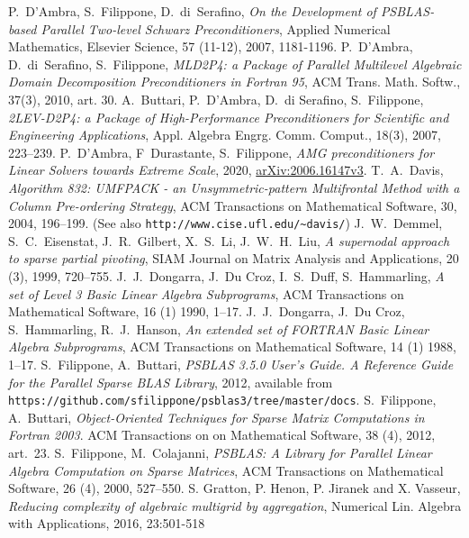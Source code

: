\begin{thebibliography}{99}
%
P.~D'Ambra, S.~Filippone,  D.~di~Serafino,
{\em On the Development of PSBLAS-based Parallel Two-level Schwarz Preconditioners},
Applied Numerical Mathematics, Elsevier Science,
57 (11-12), 2007, 1181-1196.
%
P.~D'Ambra, D.~di~Serafino, S.~Filippone,
\emph{MLD2P4: a Package of Parallel Multilevel
Algebraic Domain Decomposition Preconditioners
in Fortran 95},  ACM Trans. Math. Softw., 37(3), 2010, art. 30.
%
A.~Buttari, P.~D'Ambra, D.~di Serafino, S.~Filippone,
\emph{2{LEV}-{D}2{P}4: a Package of High-Performance Preconditioners
for Scientific and Engineering Applications}, Appl. Algebra Engrg. Comm. Comput.,
18(3), 2007, 223--239.
%
P.~D'Ambra, F~Durastante, S.~Filippone, 
\emph{AMG preconditioners for Linear Solvers towards Extreme Scale}, 2020, \href{https://arxiv.org/abs/2006.16147v3arXiv:2006.16147v2}{arXiv:2006.16147v3}.
%
T.~A.~Davis,
{\em Algorithm 832: UMFPACK - an Unsymmetric-pattern Multifrontal
Method with a Column Pre-ordering Strategy},
ACM Transactions on Mathematical Software, 30, 2004, 196--199.
(See also \texttt{http://www.cise.ufl.edu/{\textasciitilde}davis/})
%
J.~W.~Demmel, S.~C.~Eisenstat, J.~R.~Gilbert, X.~S.~Li, J.~W.~H.~Liu,
{\em A supernodal approach to sparse partial pivoting},
SIAM Journal on Matrix Analysis and Applications, 20 (3), 1999, 720--755.
%
J.~J.~Dongarra, J.~Du Croz, I.~S.~Duff, S.~Hammarling,
\emph{A set of Level 3 Basic Linear Algebra Subprograms},
ACM Transactions on Mathematical Software, 16 (1) 1990, 1--17.
%
J.~J.~Dongarra, J.~Du Croz, S.~Hammarling, R.~J.~Hanson,
\emph{An extended set of FORTRAN Basic Linear Algebra Subprograms},
ACM Transactions on Mathematical Software, 14 (1) 1988, 1--17.
%
%
%
S.~Filippone, A.~Buttari,
{\em PSBLAS 3.5.0 User's Guide. A Reference Guide for the Parallel Sparse BLAS Library}, 2012,
available from \texttt{https://github.com/sfilippone/psblas3/tree/master/docs}.
%
S.~Filippone, A.~Buttari,
{\em Object-Oriented Techniques for Sparse Matrix Computations in Fortran 2003}.
ACM Transactions on on Mathematical Software, 38 (4), 2012, art.~23.
%
S.~Filippone, M.~Colajanni,
{\em PSBLAS: A Library for Parallel Linear Algebra
Computation on Sparse Matrices},
ACM Transactions on Mathematical Software, 26 (4), 2000, 527--550.
%
S. Gratton, P. Henon, P. Jiranek and X. Vasseur,
  {\em Reducing complexity of algebraic multigrid by aggregation},
Numerical Lin. Algebra with Applications, 2016, 23:501-518


\end{thebibliography}
